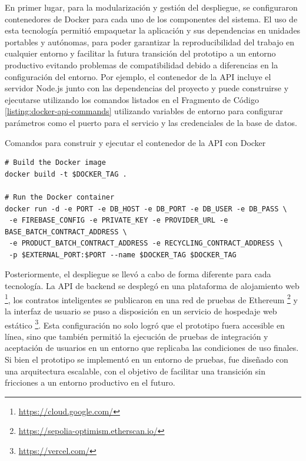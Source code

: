 En primer lugar, para la modularización y gestión del despliegue, se configuraron contenedores de Docker para cada uno de los componentes del sistema. El uso de esta tecnología permitió empaquetar la aplicación y sus dependencias en unidades portables y autónomas, para poder garantizar la reproducibilidad del trabajo en cualquier entorno y facilitar la futura transición del prototipo a un entorno productivo evitando problemas de compatibilidad debido a diferencias en la configuración del entorno. Por ejemplo, el contenedor de la API incluye el servidor Node.js junto con las dependencias del proyecto y puede construirse y ejecutarse utilizando los comandos listados en el Fragmento de Código \ref{listing:docker-api-commands} utilizando variables de entorno para configurar parámetros como el puerto para el servicio y las credenciales de la base de datos.

\begin{listing}[!htb]
\caption{Comandos para construir y ejecutar el contenedor de la API con Docker}
\label{listing:docker-api-commands}
\begin{verbatim}
# Build the Docker image
docker build -t $DOCKER_TAG .

# Run the Docker container
docker run -d -e PORT -e DB_HOST -e DB_PORT -e DB_USER -e DB_PASS \
 -e FIREBASE_CONFIG -e PRIVATE_KEY -e PROVIDER_URL -e BASE_BATCH_CONTRACT_ADDRESS \
 -e PRODUCT_BATCH_CONTRACT_ADDRESS -e RECYCLING_CONTRACT_ADDRESS \
 -p $EXTERNAL_PORT:$PORT --name $DOCKER_TAG $DOCKER_TAG
\end{verbatim}
\end{listing}


Posteriormente, el despliegue se llevó a cabo de forma diferente para cada tecnología. La API de backend se desplegó en una plataforma de alojamiento web \footnote{\url{https://cloud.google.com/}}, los contratos inteligentes se publicaron en una red de pruebas de Ethereum \footnote{\url{https://sepolia-optimism.etherscan.io/}} y la interfaz de usuario se puso a disposición en un servicio de hospedaje web estático \footnote{\url{https://vercel.com/}}. Esta configuración no solo logró que el prototipo fuera accesible en línea, sino que también permitió la ejecución de pruebas de integración y aceptación de usuarios en un entorno que replicaba las condiciones de uso finales. Si bien el prototipo se implementó en un entorno de pruebas, fue diseñado con una arquitectura escalable, con el objetivo de facilitar una transición sin fricciones a un entorno productivo en el futuro.


